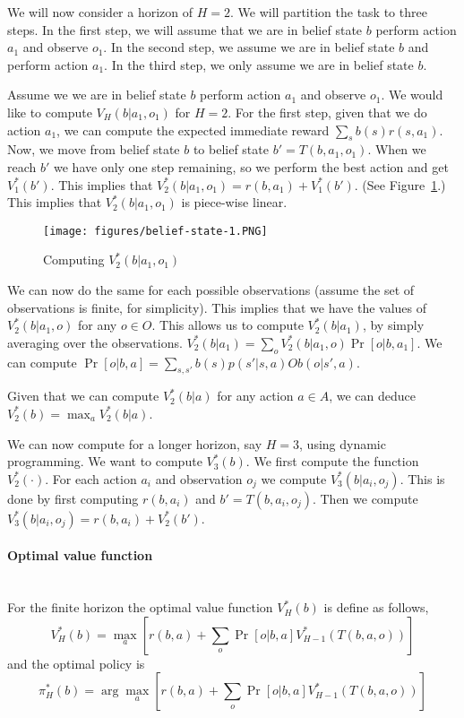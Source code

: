 We will now consider a horizon of $H=2$. We will partition the task
to three steps. In the first step, we will assume that we are in
belief state $b$ perform action $a_1$ and observe $o_1$. In the
second step, we assume we are in belief state $b$ and perform action
$a_1$. In the third step, we only assume we are in belief state $b$.

Assume we  we are in belief state $b$ perform action $a_1$ and
observe $o_1$. We would like to compute $V_H(b|a_1,o_1)$ for $H=2$.
For the first step, given that we do action $a_1$, we can compute
the expected immediate reward $\sum_s b(s)r(s,a_1)$. Now, we move
from belief state $b$ to belief state $b'=T(b,a_1,o_1)$. When we
reach $b'$ we have only one step remaining, so we perform the best
action and get $V^*_1(b')$. This implies that
$V^*_2(b|a_1,o_1)=r(b,a_1)+V^*_1(b')$. (See
Figure~\ref{fig:belief-state-1}.) This implies that
$V^*_2(b|a_1,o_1)$ is piece-wise linear.

\begin{figure}
  \begin{centering}
  \texttt{[image: figures/belief-state-1.PNG]}\\
  \caption{Computing $V^*_2(b|a_1,o_1)$}\label{fig:belief-state-1}
  \end{centering}
\end{figure}

We can now do the same for each possible observations (assume the
set of observations is finite, for simplicity). This implies that we
have the values of $V^*_2(b|a_1,o)$ for any $o\in O$. This allows us
to compute $V^*_2(b|a_1)$, by simply averaging over the
observations. $V^*_2(b|a_1)=\sum_o V^*_2(b|a_1,o)\Pr[o|b,a_1]$. We
can compute $\Pr[o|b,a]=\sum_{s,s'} b(s)p(s'|s,a)Ob(o|s',a)$.

Given that we can compute $V_2^*(b|a)$ for any action $a\in A$, we
can deduce $V_2^*(b)=\max_a V_2^*(b|a)$.

We can now compute for a longer horizon, say $H=3$, using dynamic
programming. We want to compute $V^*_3(b)$. We first compute the
function $V_2^*(\cdot)$. For each action $a_i$ and observation $o_j$
we compute $V^*_3(b|a_i,o_j)$. This is done by first computing
$r(b,a_i)$ and $b'=T(b,a_i,o_j)$. Then we compute $V^*_3(b|a_i,o_j)
= r(b,a_i)+V^*_2(b')$.

\paragraph{Optimal value function}\ \\
For the finite horizon the optimal value function $V^*_H(b)$ is
define as follows,
\[
V^*_H(b)=\max_a [r(b,a)+\sum_o \Pr[o|b,a]V^*_{H-1}(T(b,a,o))]
\]
and the optimal policy is
\[
\pi_H^*(b)=\arg\max_a [r(b,a)+\sum_o \Pr[o|b,a]V^*_{H-1}(T(b,a,o))]
\]

